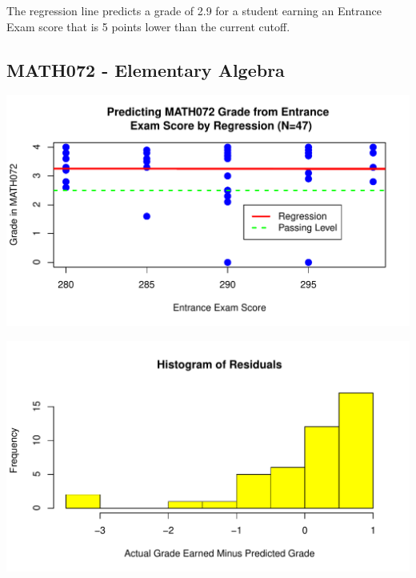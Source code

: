\documentclass[twoside]{article}\usepackage[]{graphicx}\usepackage[]{color}
\makeatletter
\def\maxwidth{ %
  \ifdim\Gin@nat@width>\linewidth
    \linewidth
  \else
    \Gin@nat@width
  \fi
}
\newenvironment{knitrout}{}{} %
\makeatother
\begin{document}
The regression line predicts a grade of 2.9 for a student earning an Entrance Exam score that is 5 points lower than the current cutoff.



\newpage
\subsection{MATH072 - Elementary Algebra}


\begin{knitrout}
\color{fgcolor}
\includegraphics[width=\maxwidth]{figure/072regressiongraph-1} 

\end{knitrout}

\begin{knitrout}
\color{fgcolor}
\includegraphics[width=\maxwidth]{figure/072residualsplot-1} 

\end{knitrout}
\end{document}

